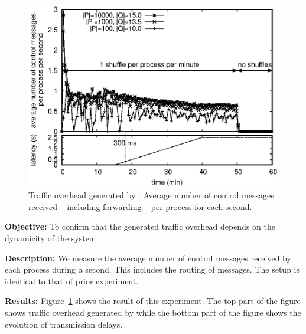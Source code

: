 \begin{figure}
  \begin{center}
    \includegraphics[width=0.8\columnwidth]{./img/controlmessages.eps}
    \caption{\label{fig:controlmessages}Traffic overhead generated by
      \RPCBROADCAST.  Average number of control messages received -- including
      forwarding -- per process for each second.}
  \end{center}
\end{figure}

\noindent \textbf{Objective:} To confirm that the generated traffic overhead
depends on the dynamicity of the system.

\noindent \textbf{Description:} We measure the average number of control
messages received by each process during a second. This includes the routing of
messages. The setup is identical to that of prior experiment.

\noindent \textbf{Results:} Figure~\ref{fig:controlmessages} shows the result of
this experiment. The top part of the figure shows traffic overhead generated by
\RPCBROADCAST while the bottom part of the figure shows the evolution of
transmission delays.

